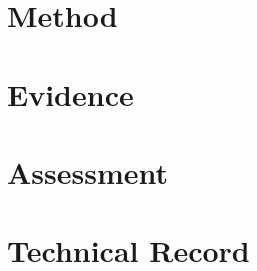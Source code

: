 \documentclass[11pt,a4paper,oneside]{report}
\begin{document}
\part{Method}



\part{Evidence}



\part{Assessment}



\appendix
\part{Technical Record}




\end{document}
